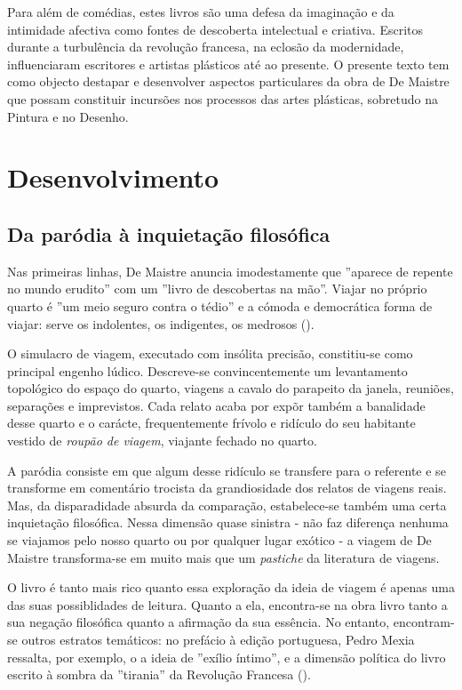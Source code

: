 \documentclass[12pt]{article}
\begin{document}
Para além de comédias, estes livros são uma defesa da imaginação e da
intimidade afectiva como fontes de descoberta intelectual e
criativa. Escritos durante a turbulência da revolução francesa, na
eclosão da modernidade, influenciaram escritores e artistas plásticos
até ao presente. O presente texto tem como objecto destapar e
desenvolver aspectos particulares da obra de De Maistre que possam
constituir incursões nos processos das artes plásticas, sobretudo na
Pintura e no Desenho.

\section{Desenvolvimento}

\subsection{Da paródia à inquietação filosófica}

Nas primeiras linhas, De Maistre anuncia imodestamente que ''aparece
de repente no mundo erudito'' com um ''livro de descobertas na
mão''. Viajar no próprio quarto é ''um meio seguro contra o tédio'' e
a cómoda e democrática forma de viajar: serve os indolentes, os
indigentes, os medrosos (\cite[p.17]{demaistre}).

O simulacro de viagem, executado com insólita precisão, constitiu-se
como principal engenho lúdico. Descreve-se convincentemente um
levantamento topológico do espaço do quarto, viagens a cavalo do
parapeito da janela, reuniões, separações e imprevistos. Cada relato
acaba por expõr também a banalidade desse quarto e o carácte,
frequentemente frívolo e ridículo do seu habitante vestido de
\emph{roupão de viagem}, viajante fechado no quarto.

A paródia consiste em que algum desse ridículo se transfere para o
referente e se transforme em comentário trocista da grandiosidade dos
relatos de viagens reais. Mas, da disparadidade absurda da comparação,
estabelece-se também uma certa inquietação filosófica. Nessa dimensão
quase sinistra - não faz diferença nenhuma se viajamos pelo nosso
quarto ou por qualquer lugar exótico - a viagem de De Maistre
transforma-se em muito mais que um \emph{pastiche} da literatura de
viagens.

O livro é tanto mais rico quanto essa exploração da ideia de viagem é
apenas uma das suas possiblidades de leitura. Quanto a ela,
encontra-se na obra livro tanto a sua negação filosófica quanto a
afirmação da sua essência. No entanto, encontram-se outros estratos
temáticos: no prefácio à edição portuguesa, Pedro Mexia ressalta, por
exemplo, o a ideia de ''exílio íntimo'', e a dimensão política do
livro escrito à sombra da ''tirania'' da Revolução Francesa
(\cite[p.10]{demaistre}).
\end{document}

